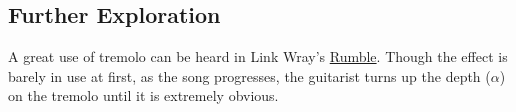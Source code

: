 \subsection{Further Exploration}
A great use of tremolo can be heard in Link Wray's \href{https://www.youtube.com/watch?v=ucTg6rZJCu4}{Rumble}. Though the effect is barely in use at first, as the song progresses, the guitarist turns up the depth ($\alpha$) on the tremolo until it is extremely obvious.